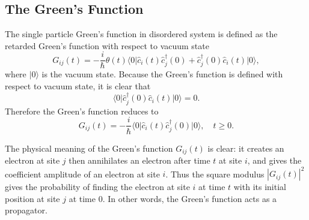 \documentclass{book}
\newcommand{\bra}[1]{{\langle#1|}}
\newcommand{\ket}[1]{{|#1\rangle}}
\numberwithin{equation}{section}
\begin{document}
\subsection*{The Green's Function}
The single particle Green's function in disordered system is defined
as the retarded Green's function with respect to vacuum state 
\begin{equation}
  G_{ij}(t)=-\frac{i}{\hbar}\theta(t)
  \bra{0}\hat{c}_i(t)\hat{c}^\dagger_j(0)+\hat{c}^\dagger_j(0)\hat{c}_i(t)\ket{0},
\end{equation}
where $\ket{0}$ is the vacuum state. Because the Green's function is
defined with respect to vacuum state, it is clear that
\begin{equation}
  \bra{0}\hat{c}_j^\dagger(0)\hat{c}_i(t)\ket{0}=0.
\end{equation}
Therefore the Green's function reduces to
\begin{equation}
  G_{ij}(t)=-\frac{i}{\hbar}\bra{0}\hat{c}_i(t)\hat{c}^\dagger_j(0)\ket{0},
  \quad t \ge 0.
\end{equation}

The physical meaning of the Green's function $G_{ij}(t)$ is clear: it
creates an electron at site $j$ then annihilates an electron after
time $t$ at site $i$, and gives the coefficient amplitude of an
electron at site $i$. Thus the square modulus $|G_{ij}(t)|^2$ gives
the probability of finding the electron at site $i$ at time $t$ with
its initial position at site $j$ at time $0$. In other words, the
Green's function acts as a propagator. 
\end{document}
